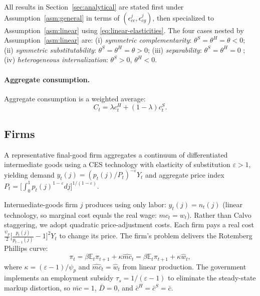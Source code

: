 All results in Section~\ref{sec:analytical} are stated first under
Assumption~\ref{asm:general} in terms of $(\epsilon^{j}_{cc},\epsilon^{j}_{cg})$,
then specialized to Assumption~\ref{asm:linear} using
\eqref{eq:linear-elasticities}. The four cases nested by
Assumption~\ref{asm:linear} are: (i) \emph{symmetric complementarity}:
$\theta^{S}=\theta^{H}=\theta<0$; (ii) \emph{symmetric substitutability}:
$\theta^{S}=\theta^{H}=\theta>0$; (iii) \emph{separability}:
$\theta^{S}=\theta^{H}=0$ \citep{Bilbiie2025}; (iv) \emph{heterogeneous
internalization}: $\theta^{S}>0$, $\theta^{H}<0$.

\paragraph{Aggregate consumption.}
Aggregate consumption is a weighted average:
\begin{equation}\label{eq:agg-consumption}
  C_{t}=\lambda c^{H}_{t}+(1-\lambda)c^{S}_{t}.
\end{equation}

\subsection{Firms}\label{subsec:firms}
A representative final-good firm aggregates a continuum of differentiated
intermediate goods using a CES technology with elasticity of substitution
$\varepsilon>1$, yielding demand $y_{t}(j)=(p_{t}(j)/P_{t})^{-\varepsilon}Y_{t}$
and aggregate price index
$P_{t}=\bigl[\int_{0}^{1}p_{t}(j)^{1-\varepsilon}dj\bigr]^{1/(1-\varepsilon)}$.

Intermediate-goods firm $j$ produces using only labor: $y_{t}(j)=n_{t}(j)$
(linear technology, so marginal cost equals the real wage: $mc_{t}=w_{t}$).
Rather than Calvo staggering, we adopt \citet{Rotemberg1982} quadratic
price-adjustment costs. Each firm pays a real cost
$\tfrac{\psi_{p}}{2}\bigl[\tfrac{p_{t}(j)}{p_{t-1}(j)}-1\bigr]^{2}Y_{t}$ to
change its price. The firm's problem delivers the Rotemberg Phillips curve:
\begin{equation}\label{eq:nkpc}
  \pi_{t}=\beta\mathbb{E}_{t}\pi_{t+1}+\kappa\hat{mc}_{t}
        =\beta\mathbb{E}_{t}\pi_{t+1}+\kappa\hat w_{t},
\end{equation}
where $\kappa=(\varepsilon-1)/\psi_{p}$ and $\hat{mc}_{t}=\hat w_{t}$ from
linear production. The government implements an employment subsidy
$\tau_{s}=1/(\varepsilon-1)$ to eliminate the steady-state markup distortion,
so $\bar{mc}=1$, $\bar D=0$, and $\bar c^{H}=\bar c^{S}=\bar c$.

